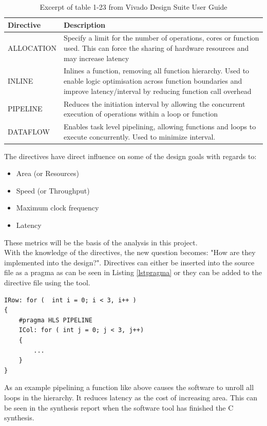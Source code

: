 \begin{table}[H]
\centering
    \begin{tabular}{|l|p{10cm}|}
    \hline
    Directive  & Description                                                                                                                                                                       \\ \hline
    ALLOCATION & Specify a limit for the number of operations, cores or function used. This can force the sharing of hardware resources and may increase latency                                   \\ \hline
    INLINE     & Inlines a function, removing all function hierarchy. Used to enable logic optimisation across function boundaries and improve latency/interval by reducing function call overhead \\ \hline
    PIPELINE   & Reduces the initiation interval by allowing the concurrent execution of operations within a loop or function                                                                      \\ \hline
    DATAFLOW   & Enables task level pipelining, allowing functions and loops to execute concurrently. Used to minimize interval.                                                                                                                                                                                 \\ \hline
    \end{tabular}
    \caption{Excerpt of table 1-23 from Vivado Design Suite User Guide}
    \label{tab:directives}
\end{table}
The directives have direct influence on some of the design goals with regards to:
\begin{itemize}
\item Area (or Resources)
\item Speed (or Throughput)
\item Maximum clock frequency
\item Latency
\end{itemize}
These metrics will be the basis of the analysis in this project.\\

With the knowledge of the directives, the new question becomes: "How are they implemented into the design?". Directives can either be inserted into the source file as a pragma as can be seen in Listing \ref{lstpragma} or they can be added to the directive file using the tool.
\begin{lstlisting}[caption={Inserting directive into source code.},label=lstpragma]
IRow: for (  int i = 0; i < 3, i++ )
{
	#pragma HLS PIPELINE
	ICol: for ( int j = 0; j < 3, j++)
	{
		...
	}
}
\end{lstlisting}
As an example pipelining a function like above causes the software to unroll all loops in the hierarchy. It reduces latency as the cost of increasing area. This can be seen in the synthesis report when the software tool has finished the C synthesis.

